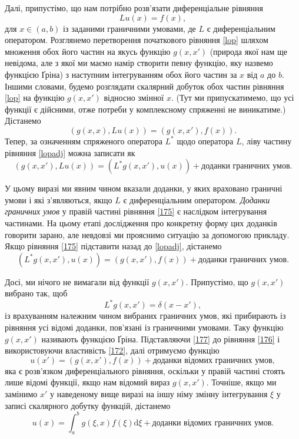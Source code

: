 \documentclass[14pt,twoside]{extreport}
\theoremstyle{mystyle}
\numberwithin{equation}{chapter}
\begin{document}
Далі, припустімо, що нам потрібно розв'язати диференціальне рівняння
\begin{equation}\label{lop}
Lu(x)=f(x),
\end{equation}
для $x\in(a,b)$ із заданими граничними умовами, де $L$ є диференціальним оператором. Розглянемо перетворення початкового рівняння \eqref{lop} шляхом множення обох його частин на якусь функцію $g(x, x')$ (природа якої нам ще невідома, але з якої ми маємо намір створити певну функцію, яку назвемо функцією Ґріна) з наступним інтегруванням обох його частин за $x$ від $a$ до $b$. Іншими словами, будемо розглядати скалярний добуток обох частин рівняння \eqref{lop} на функцію $g(x, x')$ відносно змінної $x$. (Тут ми припускатимемо, що усі функції є дійсними, отже потреби у комплексному спряженні не виникатиме.) Дістанемо
\begin{equation}\label{lopadj}
(g(x, x), Lu(x))=(g(x, x'),f(x)).
\end{equation}
Тепер, за означенням спряженого оператора $L^{*}$ щодо оператора $L$, ліву частину рівняння \eqref{lopadj} можна записати як
\begin{equation}\label{175}
(g(x, x'), L u(x)) = (L^{*} g(x, x'), u(x))+\textrm{доданки граничних умов}.
\end{equation}

У цьому виразі ми явним чином вказали доданки, у яких враховано граничні умови і які з'являються, якщо $L$ є диференціальним оператором. \emph{Доданки граничних умов} у правій частині рівняння \eqref{175} є наслідком інтегрування частинами. На цьому етапі дослідження про конкретну форму цих доданків говорити зарано, але невдовзі ми прояснимо ситуацію за допомогою прикладу. Якщо рівняння \eqref{175} підставити назад до \eqref{lopadj}, дістанемо
\begin{equation}\label{176}
(L^{*}g(x, x'), u(x))=(g(x, x'), f(x)) + \textrm{доданки граничних умов}.
\end{equation}

Досі, ми нічого не вимагали від функції $g(x, x')$. Припустімо, що $g(x, x')$ вибрано так, щоб
\begin{equation}\label{177}
L^{*}g(x,x')=\delta(x-x'),
\end{equation}
із врахуванням належним чином вибраних граничних умов, які прибирають із рівняння усі відомі доданки, пов'язані із граничними умовами. Таку функцію $g(x, x')$ називають функцією Ґріна. Підставляючи \eqref{177} до рівняння \eqref{176} і використовуючи властивість \eqref{172}, далі отримуємо функцію
\begin{equation}\label{178}
u(x')=(g(x, x'), f(x)) + \textrm{доданки відомих граничних умов},
\end{equation}
яка є розв'язком диференціального рівняння, оскільки у правій частині стоять лише відомі функції, якщо нам відомий вираз $g(x, x')$. Точніше, якщо ми замінимо $x'$ у наведеному вище виразі на іншу німу змінну інтегрування $\xi$ у записі скалярного добутку функцій, дістанемо
\begin{equation}\label{179}
u(x)=\int_{a}^{b}g(\xi, x)f(\xi)\mathrm{d}\xi + \textrm{доданки відомих граничних умов}.
\end{equation}
\end{document}

